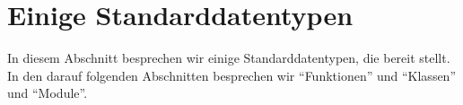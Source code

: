 \section{Einige Standarddatentypen}
\label{section:std_data_types}
In diesem Abschnitt besprechen wir einige Standarddatentypen, die \Python bereit stellt.
In den darauf folgenden Abschnitten besprechen wir ``Funktionen'' und ``Klassen'' und ``Module''.







